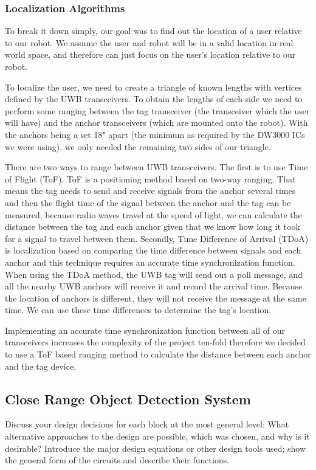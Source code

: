 \documentclass{report}
\begin{document}
    \subsubsection{Localization Algorithms} 
    To break it down simply, our goal was to find out the location of a user relative to our robot. We assume the user and robot will be in a valid location in real world space, and therefore can just focus on the user's location relative to our robot.

    To localize the user, we need to create a triangle of known lengths with vertices defined by the UWB transceivers. To obtain the lengths of each side we need to perform some ranging between the tag transceiver (the transceiver which the user will have) and the anchor transceivers (which are mounted onto the robot). With the anchors being a set 18" apart (the minimum as required by the DW3000 ICs we were using), we only needed the remaining two sides of our triangle.

    There are two ways to range between UWB transceivers. The first is to use Time of Flight (ToF). ToF is a positioning method based on two-way ranging. That means the tag needs to send and receive signals from the anchor several times and then the flight time of the signal between the anchor and the tag can be measured, because radio waves travel at the speed of light, we can calculate the distance between the tag and each anchor given that we know how long it took for a signal to travel between them. Secondly, Time Difference of Arrival (TDoA) is localization based on comparing the time difference between signals and each anchor and this technique requires an accurate time synchronization function. When using the TDoA method, the UWB tag will send out a poll message, and all the nearby UWB anchors will receive it and record the arrival time. Because the location of anchors is different, they will not receive the message at the same time. We can use these time differences to determine the tag’s location.

    Implementing an accurate time synchronization function between all of our transceivers increases the complexity of the project ten-fold therefore we decided to use a ToF based ranging method to calculate the distance between each anchor and the tag device.
    
    \subsection{Close Range Object Detection System}
    Discuss your design decisions for each block at the most general level: What alternative approaches to the design are possible, which was chosen, and why is it desirable? Introduce the major design equations or other design tools used; show the general form of the circuits and describe their functions.
\end{document}

